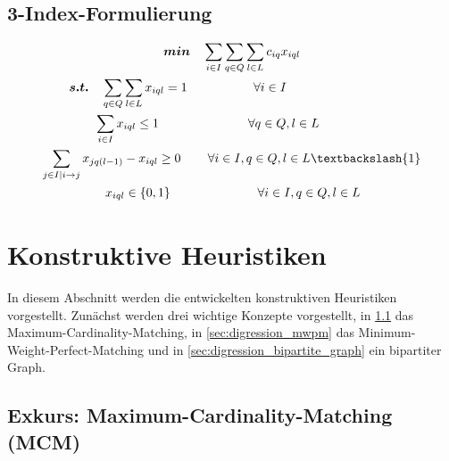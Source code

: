 \subsection{3-Index-Formulierung}
\label{sec:three_idx_formulation}

\begin{gather}
\boldsymbol{min} \quad \sum_{i \in I} \sum_{q \in Q} \sum_{l \in L} c_{iq} x_{iql} \\
\boldsymbol{s.t.} \quad \sum_{q \in Q} \sum_{l \in L} x_{iql} = 1 \quad\thinspace\thinspace\quad\quad\quad\quad \forall i \in I \thinspace\thinspace\quad\quad\quad\quad\quad\quad\quad\quad\thinspace\thinspace \\
\sum_{i \in I} x_{iql} \leq 1 \thinspace\quad\quad\quad\quad\quad\quad\quad \forall q \in Q, l \in L \thinspace\thinspace\thinspace\thinspace\quad\quad\quad\thinspace \\
\sum_{j \in I | i \rightarrow j} x_{jq(l-1)} - x_{iql} \geq 0 \thinspace\quad\quad \forall i \in I, q \in Q, l \in L \textbackslash \{1\} \\
\quad\quad x_{iql} \in \{0, 1\} \quad\quad\quad\quad\quad\quad\quad \forall i \in I, q \in Q, l \in L \quad\thinspace\thinspace\thinspace\thinspace\thinspace
\end{gather}


\pagebreak

\section{Konstruktive Heuristiken}
\label{sec:constructive_heuristics}

In diesem Abschnitt werden die entwickelten konstruktiven Heuristiken vorgestellt.
Zunächst werden drei wichtige Konzepte vorgestellt, in \ref{sec:digression_mcm} das Maximum-Cardinality-Matching,
in \ref{sec:digression_mwpm} das Minimum-Weight-Perfect-Matching und in \ref{sec:digression_bipartite_graph} ein
bipartiter Graph.

\subsection{Exkurs: Maximum-Cardinality-Matching (MCM)}
\label{sec:digression_mcm}

